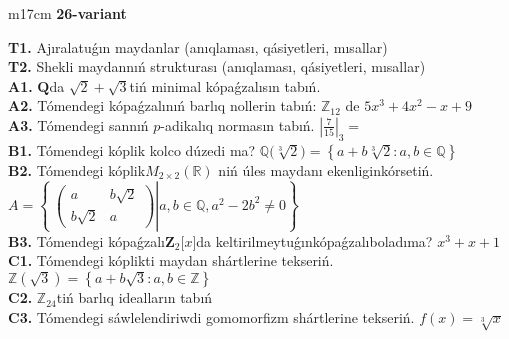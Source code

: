 \documentclass{article}
\begin{document}
\begin{tabular}{m{17cm}}
\textbf{26-variant}
\newline

\textbf{T1.} Ajıralatuǵın maydanlar (anıqlaması, qásiyetleri, mısallar) \\
\textbf{T2.} Shekli maydannıń strukturası (anıqlaması, qásiyetleri, mısallar) \\
\textbf{A1.} \(\mathbf{Q}\)da \(\sqrt{2} + \sqrt{3}\)tiń minimal kópaǵzalısın tabıń. \\
\textbf{A2.} Tómendegi kópaǵzalınıń barlıq nollerin tabıń: \(\mathbb{Z}_{12}\) de \(5x^{3} + 4x^{2} - x + 9\) \\
\textbf{A3.} Tómendegi sannıń \(p\)-adikalıq normasın tabıń. \(|\frac{7}{15}|_{3} =\) \\
\textbf{B1.} Tómendegi kóplik kolco dúzedi ma? \(\mathbb{Q(}\sqrt[3]{2}) = \left\{ a + b\sqrt[3]{2}:a,b \in \mathbb{Q} \right\}\) \\
\textbf{B2.} Tómendegi kóplik\(M_{2 \times 2}\left( \mathbb{R} \right)\) niń úles maydanı ekenliginkórsetiń. \(A = \left\{ \left. \ \begin{pmatrix}
a & b\sqrt{2} \\
b\sqrt{2} & a
\end{pmatrix} \right|a,b\mathbb{\in Q},a^{2} - 2b^{2} \neq 0 \right\}\) \\
\textbf{B3.} Tómendegi kópaǵzalı\(\mathbf{Z}_{2}\lbrack x\rbrack\)da keltirilmeytuǵınkópaǵzalıboladıma? \(x^{3} + x + 1\) \\
\textbf{C1.} Tómendegi kóplikti maydan shártlerine tekseriń. \(\mathbb{Z}\left( \sqrt{3} \right) = \left\{ a + b\sqrt{3}:a,b \in \mathbb{Z} \right\}\) \\
\textbf{C2.} \(\mathbb{Z}_{24}\)tiń barlıq idealların tabıń \\
\textbf{C3.} Tómendegi sáwlelendiriwdi gomomorfizm shártlerine tekseriń. \(f(x) = \sqrt[3]{x}\) \\

\end{tabular}
\vspace{1cm}
\end{document}
